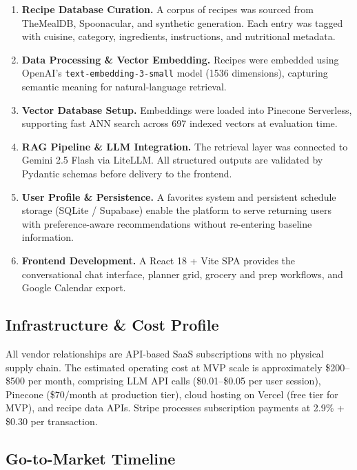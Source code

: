 \documentclass[12pt,letterpaper]{article}
\begin{document}
\begin{enumerate}[itemsep=2pt, leftmargin=*]
  \item \textbf{Recipe Database Curation.} A corpus of recipes was sourced from
    TheMealDB, Spoonacular, and synthetic generation. Each entry was tagged with
    cuisine, category, ingredients, instructions, and nutritional metadata.

  \item \textbf{Data Processing \& Vector Embedding.} Recipes were embedded using
    OpenAI's \texttt{text-embedding-3-small} model (1536 dimensions), capturing
    semantic meaning for natural-language retrieval.

  \item \textbf{Vector Database Setup.} Embeddings were loaded into Pinecone
    Serverless, supporting fast ANN search across 697 indexed vectors at evaluation time.

  \item \textbf{RAG Pipeline \& LLM Integration.} The retrieval layer was connected to
    Gemini 2.5 Flash via LiteLLM. All structured outputs are validated by Pydantic schemas
    before delivery to the frontend.

  \item \textbf{User Profile \& Persistence.} A favorites system and persistent schedule
    storage (SQLite / Supabase) enable the platform to serve returning users with
    preference-aware recommendations without re-entering baseline information.

  \item \textbf{Frontend Development.} A React 18 + Vite SPA provides the conversational
    chat interface, planner grid, grocery and prep workflows, and Google Calendar export.
\end{enumerate}

\subsection{Infrastructure \& Cost Profile}

All vendor relationships are API-based SaaS subscriptions with no physical supply chain.
The estimated operating cost at MVP scale is approximately \$200--\$500 per month,
comprising LLM API calls (\$0.01--\$0.05 per user session), Pinecone (\$70/month at
production tier), cloud hosting on Vercel (free tier for MVP), and recipe data APIs.
Stripe processes subscription payments at 2.9\% + \$0.30 per transaction.

\subsection{Go-to-Market Timeline}
\end{document}

